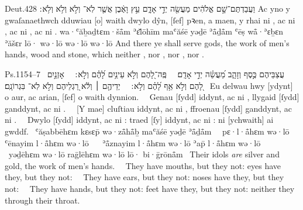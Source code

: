 \begin{example}{Deut.}{4}{28}{}{}
	\quoling
	{וַעֲבַדְתֶּם־שָׁ֣ם אֱלֹהִ֔ים מַעֲשֵׂ֖ה יְדֵ֣י אָדָ֑ם עֵ֣ץ וָאֶ֔בֶן אֲשֶׁ֤ר לֹֽא־ וְלֹ֣א  וְלֹ֥א  וְלֹ֥א ׃}
	{Ac yno y gwaſanaethwch dduwiau [o] waith dwylo dŷn, [ſef] pꝛen, a maen, y rhai ni , ac ni , ac ni , ac ni .}
	{wa·ʿăḇaḏtɛm·šå̄m ʾɛ̆lōhīm maʿăśē yəḏē ʾå̄ḏå̄m ʿēṣ wå̄·ʾɛḇɛn ʾăšɛr lō· wə·lō  wə·lō  wə·lō }
	{And there ye shall serve gods, the work of men’s hands, wood and stone, which neither , nor , nor , nor .}
\end{example}

\begin{example}{Ps.}{115}{4–7}{}{}
	\quoling
	{%
		~עֲצַבֵּיהֶם כֶּ֣סֶף וְזָהָ֑ב מַ֝עֲשֵׂ֗ה יְדֵ֣י אָדָֽם׃\ %
		~פֶּֽה־לָ֭הֶם וְלֹ֣א  עֵינַ֥יִם לָ֝הֶ֗ם וְלֹ֣א ׃\ %
		~אָזְנַ֣יִם לָ֭הֶם וְלֹ֣א  אַ֥ף לָ֝הֶ֗ם וְלֹ֣א ׃\ %
		~יְדֵיהֶ֤ם ׀ וְלֹ֬א  רַ֭גְלֵיהֶם וְלֹ֣א  לֹֽא־ בִּגְרוֹנָֽם׃
	}
	{%
		~Eu delwau hwy [ydynt] o aur, ac arian, [ſef] o waith dynnion.\ %
		~Genau [ſydd] iddynt, ac ni , llygaid [ſydd] ganddynt, ac ni .\ %
		~[Y mae] cluſtiau iddynt, ac ni , ffroenau [ſydd] ganddynt, ac ni .\ %
		~Dwylo [ſydd] iddynt, ac ni : traed [ſy] iddynt, ac ni : ni  [ychwaith] ai gwddf.
	}
	{%
		~ʿăṣabbēhɛm kɛsɛp̄ wə·zå̄hå̄ḇ maʿăśē yəḏē ʾå̄ḏå̄m\ %
		~pɛ·l·å̄hɛm wə·lō  ʿēnayim l·å̄hɛm wə·lō \ %
		~ʾå̄znayim l·å̄hɛm wə·lō  ʾap̄ l·å̄hɛm wə·lō \ %
		~yəḏēhɛm wə·lō  raḡlēhɛm wə·lō  lō· bi·ḡrōnå̄m
	}
	{%
		~Their idols \textit{are} silver and gold, the work of men’s hands.\ %
		~They have mouths, but they  not: eyes have they, but they  not:\ %
		~They have ears, but they  not: noses have they, but they  not:\ %
		~They have hands, but they  not: feet have they, but they  not: neither  they through their throat.
	}
\end{example}

